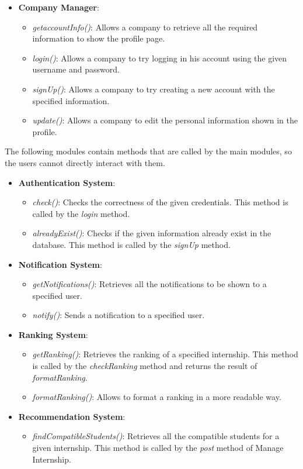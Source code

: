 \documentclass[11pt,twoside]{article}
\begin{document}
\begin{itemize}
\item \textbf{Company Manager}:
	\begin{itemize}
	\item \textit{getaccountInfo()}: Allows a company to retrieve all the required information to show the profile page.
	\item \textit{login()}: Allows a company to try logging in his account using the given username and password.
	\item \textit{signUp()}: Allows a company to try creating a new account with the specified information.
	\item \textit{update()}: Allows a company to edit the personal information shown in the profile.
	\end{itemize}
\end{itemize}

The following modules contain methods that are called by the main modules, so the users cannot directly interact with them.

\begin{itemize}
\item \textbf{Authentication System}:
	\begin{itemize}
	\item \textit{check()}: Checks the correctness of the given credentials. This method is called by the \textit{login} method.
	\item \textit{alreadyExist()}: Checks if the given information already exist in the database. This method is called by the \textit{signUp} method.
	\end{itemize}
	
\item \textbf{Notification System}:
	\begin{itemize}
	\item \textit{getNotifications()}: Retrieves all the notifications to be shown to a specified user.
	\item \textit{notify()}: Sends a notification to a specified user.
	\end{itemize}
	
\item \textbf{Ranking System}:
	\begin{itemize}
	\item \textit{getRanking()}: Retrieves the ranking of a specified internship. This method is called by the \textit{checkRanking} method and returns the result of \textit{formatRanking}.
	\item \textit{formatRanking()}: Allows to format a ranking in a more readable way.
	\end{itemize}
	
\item \textbf{Recommendation System}:
	\begin{itemize}
	\item \textit{findCompatibleStudents()}: Retrieves all the compatible students for a given internship. This method is called by the \textit{post} method of Manage Internship.
	\end{itemize}
\end{itemize}
	
\end{document}
